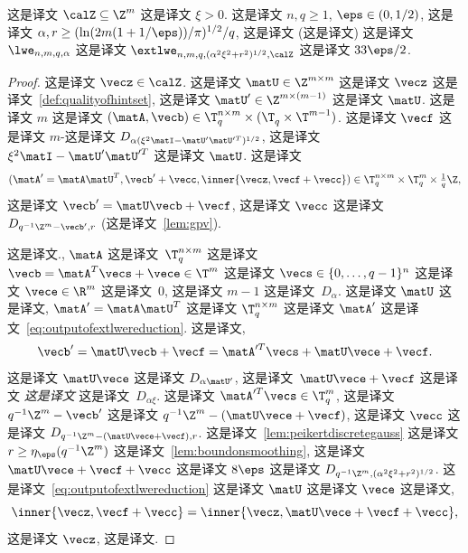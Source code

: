 \begin{lemma}\label{lem:redtoextlwe} 这是译文 $\calZ \subseteq \Z^m$ 这是译文 $\xi>0$. 这是译文 $n,q \ge 1$, $\eps \in (0,1/2)$, 这是译文 $\alpha,r  \ge (\ln(2m(1+1/\eps))/\pi)^{1/2}/q$, 这是译文 (这是译文) 这是译文 $\lwe_{n,m,q,\alpha}$ 这是译文 $\extlwe_{n,m,q,(\alpha^2 \xi^2 + r^2)^{1/2},\calZ}$ 这是译文 $33 \eps/2$. 
\end{lemma}
\begin{proof}
这是译文 $\vecz \in \calZ$. 这是译文 $\matU \in \Z^{m \times m}$ 这是译文 $\vecz$ 这是译文~\ref{def:qualityofhintset}, 这是译文 $\matU' \in \Z^{m \times (m-1)}$ 这是译文 $\matU$. 这是译文 $m$ 这是译文 $(\matA, \vecb) \in \T_q^{n \times m} \times (\T_q^{} \times \T^{m-1})$. 这是译文 $\vecf$ 这是译文 $m$-这是译文 $D_{\alpha(\xi^2 \matI - \matU' \matU'^T)^{1/2}}$,  这是译文 $\xi^2 \matI - \matU' \matU'^T$ 这是译文 $\matU$. 这是译文 \begin{equation}\label{eq:outputofextlwereduction}
(\matA'= \matA \matU^T,
  \vecb' + \vecc,
	\inner{\vecz , \vecf + \vecc})
	\in \T_q^{n \times m} \times \T_q^m \times {\textstyle{\frac{1}{q}}}\Z,
\end{equation} 这是译文 $\vecb'=\matU \vecb + \vecf$, 这是译文 $\vecc$ 这是译文 $D_{q^{-1}\Z^m - \vecb',r}$ (这是译文~\ref{lem:gpv}). 

这是译文., $\matA$ 这是译文~$\T_q^{n \times m}$ 这是译文 $\vecb = \matA^T \vecs + \vece \in \T^m$ 这是译文 $\vecs \in \{0,\ldots,q-1\}^n$ 这是译文 $\vece \in \R^m$ 这是译文~$0$,  这是译文 $m-1$ 这是译文~$D_\alpha$. 这是译文 $\matU$ 这是译文, $\matA' = \matA \matU^T$ 这是译文 $\T_q^{n \times m}$ 这是译文 $\matA'$ 这是译文~\eqref{eq:outputofextlwereduction}. 这是译文, \[
\vecb' =
\matU \vecb + \vecf =
\matA'^T \vecs + \matU \vece + \vecf.
\] 这是译文 $\matU \vece$ 这是译文 $D_{\alpha \matU'}$, 这是译文~$\matU \vece + \vecf$ 这是译文 \emph{这是译文} 这是译文~$D_{\alpha \xi}$. 这是译文 $\matA'^T \vecs \in \T_q^m$, 这是译文 $q^{-1}\Z^m - \vecb'$ 这是译文 $q^{-1}\Z^m - (\matU \vece + \vecf)$, 这是译文 $\vecc$ 这是译文 $D_{q^{-1}\Z^m - (\matU \vece + \vecf),r}$. 这是译文~\ref{lem:peikertdiscretegauss} 这是译文 $r \ge \eta_\eps(q^{-1}\Z^m)$  这是译文~\ref{lem:boundonsmoothing}, 这是译文 $\matU \vece + \vecf + \vecc$ 这是译文 $8 \eps$  这是译文 $D_{q^{-1}\Z^m,(\alpha^2 \xi^2 + r^2)^{1/2}}$. 这是译文~\eqref{eq:outputofextlwereduction} 这是译文 $\matU$ 这是译文 $\vece$ 这是译文, \[
\inner{\vecz, \vecf + \vecc} = \inner{\vecz, \matU\vece + \vecf + \vecc},
\] 这是译文 $\vecz$, 这是译文.


\end{proof}
